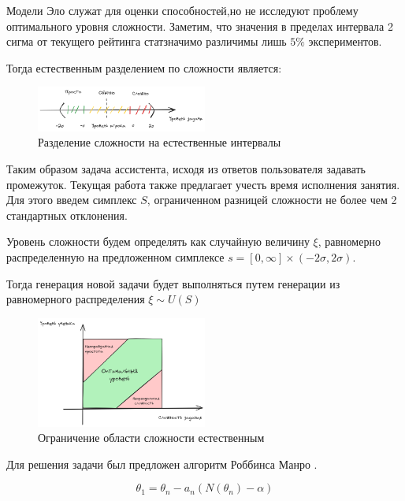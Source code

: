 Модели Эло служат для оценки способностей,но не исследуют проблему оптимального уровня сложности.
Заметим, что значения в пределах интервала 2 сигма от текущего рейтинга статзначимо различимы лишь $5\%$ экспериментов. 

Тогда естественным разделением по сложности является:

\begin{figure}[h]
    \centering
    \includegraphics[width=0.5\textwidth]{assets/work/rating/interval.excalidraw.png}
    \caption{Разделение сложности на естественные интервалы}
    \label{interval}
\end{figure}

Таким образом задача ассистента, исходя из ответов пользователя задавать промежуток. Текущая работа также предлагает учесть время исполнения занятия. Для этого введем симплекс $S$, ограниченном разницей сложности не более чем 2 стандартных отклонения.

Уровень сложности будем определять как случайную величину $\xi$, равномерно распределенную на предложенном симплексе $s = \left[0,\infty\right] \times \left(-2\sigma,2\sigma\right)$.

Тогда генерация новой задачи будет выполняться путем генерации из равномерного распределения $\xi \sim U(S)$

\begin{figure}[h]
    \centering
    \includegraphics[width=0.5\textwidth]{assets/work/rating/restricted.excalidraw.png}
    \caption{Ограничение области сложности естественным}
    \label{restrict}
\end{figure}



Для решения задачи был предложен алгоритм Роббинса Манро \cite{robbins1951stochastic}.


$$
    \theta_1 = \theta_n - a_n \left(N(\theta_n) -\alpha\right)
$$



